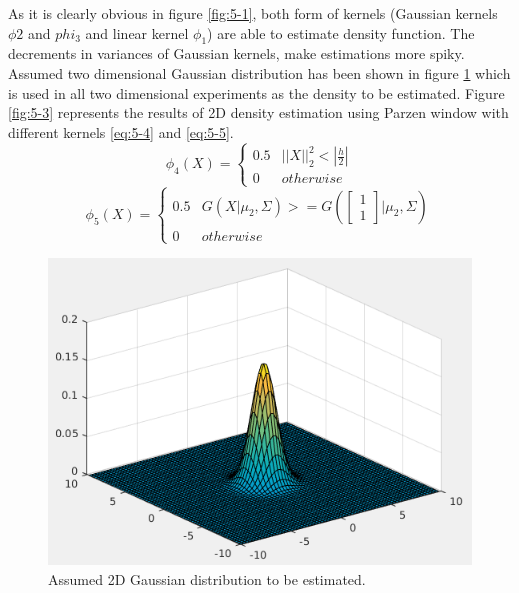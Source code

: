 \documentclass[12pt]{article}
\begin{document}
\begin{itemize}
As it is clearly obvious in figure \ref{fig:5-1}, both form of kernels (Gaussian kernels $\phi2$ and $phi_3$ and linear kernel $\phi_1$) are able to estimate density function. The decrements in variances of Gaussian kernels, make estimations more spiky.\\
Assumed two dimensional Gaussian distribution has been shown in figure \ref{fig:5-2} which is used in all two dimensional experiments as the density to be estimated. Figure \ref{fig:5-3} represents the results of 2D density estimation using Parzen window with different kernels \eqref{eq:5-4} and \eqref{eq:5-5}.
\begin{equation}
\phi_4(X) = \left\lbrace \begin{matrix}
0.5 & ||X||_2^2 < |\frac{h}{2}| \\
0 & otherwise
\end{matrix}\right.
\label{eq:5-4}
\end{equation}
\begin{equation}
\phi_5(X) = \left\lbrace \begin{matrix}
0.5 & G(X|\mu_2, \Sigma) >= G(\left[ \begin{matrix} 1 \\ 1 \end{matrix}\right]|\mu_2,\Sigma) \\
0 & otherwise
\end{matrix}\right.
\label{eq:5-5}
\end{equation}
\begin{figure}[h]
\centering
\includegraphics[scale=0.4]{Imgs/5-8.png}
\caption{Assumed 2D Gaussian distribution to be estimated.}
\label{fig:5-2}
\end{figure}

\end{itemize}
\end{document}
